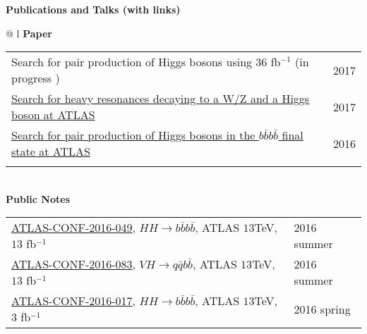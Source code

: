 \documentclass[letterpaper,11pt,oneside]{article}
\newcommand{\blue}[1]{\textcolor[rgb]{0,0,0.9}{#1}}
\begin{document}
\newpage
\raggedright
 \textbf{\Large{Publications and Talks (with links)}} \\
\vspace{-0.5cm}
\normalsize
\begin{flushleft}
\hspace{1cm}
 \begin{tabular}{@{} l}
    \textbf{Paper} \\ 
    \begin{tabular}{@{} l l }
    Search for pair production of Higgs bosons using $36$ fb$^{-1}$ (in progress )& 2017 \\
    \blue{\href{http://arxiv.org/abs/1606.04782}{Search for heavy resonances decaying to a W/Z and a Higgs boson at ATLAS}} & 2017 \\
    \blue{\href{http://arxiv.org/abs/1606.04782}{Search for pair production of Higgs bosons in the $b\bar{b}b\bar{b}$ final state at ATLAS}} & 2016 \\
    \hspace{0.8\linewidth} & \hspace{0.1\linewidth} \\
     \end{tabular}
     \\
    \textbf{Public Notes} \\ 
    \begin{tabular}{@{} l l }
    \blue{\href{https://atlas.web.cern.ch/Atlas/GROUPS/PHYSICS/CONFNOTES/ATLAS-CONF-2016-049/}{ATLAS-CONF-2016-049}}, $HH\to  b\bar{b}b\bar{b}$, ATLAS $13$TeV, $13$ fb$^{-1}$ & 2016 summer\\
    \blue{\href{https://atlas.web.cern.ch/Atlas/GROUPS/PHYSICS/CONFNOTES/ATLAS-CONF-2016-083/}{ATLAS-CONF-2016-083}}, $VH\to  q\bar{q}b\bar{b}$, ATLAS $13$TeV, $13$ fb$^{-1}$ & 2016 summer\\
    \blue{\href{https://atlas.web.cern.ch/Atlas/GROUPS/PHYSICS/CONFNOTES/ATLAS-CONF-2016-017/}{ATLAS-CONF-2016-017}}, $HH\to  b\bar{b}b\bar{b}$, ATLAS $13$TeV, $3$ fb$^{-1}$ & 2016 spring\\
    

\end{tabular}
\end{tabular}
\end{flushleft}
\end{document}
